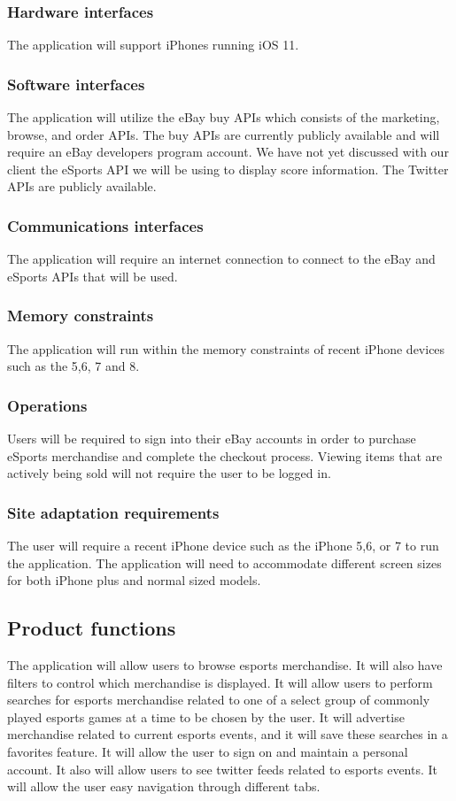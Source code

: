 \documentclass[onecolumn, draftclsnofoot,10pt, compsoc]{IEEEtran}
\begin{document}
\subsubsection{Hardware interfaces}
The application will support iPhones running iOS 11.

\subsubsection{Software interfaces}
The application will utilize the eBay buy APIs which consists of the marketing, browse, and order APIs. The buy APIs are currently publicly available and will require an eBay developers program account. We have not yet discussed with our client the eSports API we will be using to display score information. The Twitter APIs are publicly available.

\subsubsection{Communications interfaces}
The application will require an internet connection to connect to the eBay and eSports APIs that will be used.

\subsubsection{Memory constraints}
The application will run within the memory constraints of recent iPhone devices such as the 5,6, 7 and 8.

\subsubsection{Operations}
Users will be required to sign into their eBay accounts in order to purchase eSports merchandise and complete the checkout process. 
Viewing items that are actively being sold will not require the user to be logged in. 

\subsubsection{Site adaptation requirements}
The user will require a recent iPhone device such as the iPhone 5,6, or 7 to run the application. The application will need to accommodate different screen sizes for both iPhone plus and normal sized models. 

\subsection{Product functions}
The application will allow users to browse esports merchandise. It will also have filters to control which merchandise is displayed.  It will allow users to perform searches for esports merchandise related to one of a select group of commonly played esports games at a time to be chosen by the user. It will advertise merchandise related to current esports events, and it will save these searches in a favorites feature. It will allow the user to sign on and maintain a personal account. It also will allow users to see twitter feeds related to esports events.  It will allow the user easy navigation through different tabs. 
\end{document}

